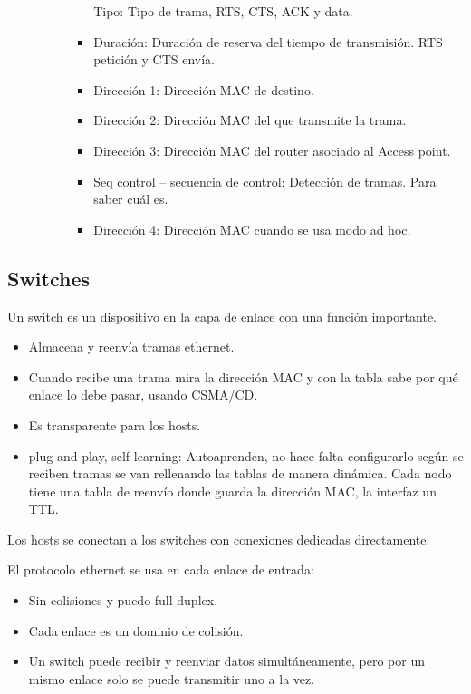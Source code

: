 \documentclass[12pt, twoside, openright]{report} %
\begin{document}
\begin{itemize}
\begin{itemize}
\begin{itemize}
\begin{itemize}
      Tipo: Tipo de trama, RTS, CTS, ACK y data.

      \item Duración: Duración de reserva del tiempo de transmisión. RTS petición y CTS envía.
      \item Dirección 1: Dirección MAC de destino.
      \item Dirección 2: Dirección MAC del que transmite la trama.
      \item Dirección 3: Dirección MAC del router asociado al Access point.
      \item Seq control – secuencia de control: Detección de tramas. Para saber cuál es.
      \item Dirección 4: Dirección MAC cuando se usa modo ad hoc.
    \end{itemize}
  
  \end{itemize}



    \end{itemize}
  \end{itemize}

  \subsection{Switches}

  Un switch es un dispositivo en la capa de enlace con una función
  importante.

  \begin{itemize}
    \item
      Almacena y reenvía tramas ethernet.
    \item
      Cuando recibe una trama mira la dirección MAC y con la tabla
      sabe por qué enlace lo debe pasar, usando CSMA/CD.
    \item
      Es transparente para los hosts.
    \item
      plug-and-play, self-learning: Autoaprenden, no hace falta
      configurarlo según se reciben tramas se van rellenando las
      tablas de manera dinámica. Cada nodo tiene una tabla de reenvío
      donde guarda la dirección MAC, la interfaz un TTL.
  \end{itemize}

  Los hosts se conectan a los switches con conexiones dedicadas
  directamente.

  El protocolo ethernet se usa en cada enlace de entrada:

  \begin{itemize}
    \item
      Sin colisiones y puedo full duplex.
    \item
      Cada enlace es un dominio de colisión.
    \item
      Un switch puede recibir y reenviar datos simultáneamente, pero
      por un mismo enlace solo se puede transmitir uno a la vez.
  \end{itemize}
\end{document}
